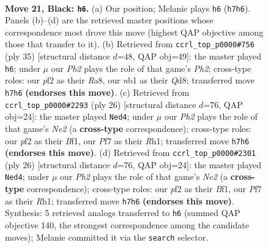 \documentclass[11pt]{article}
\begin{document}
\clearpage

\begin{figure}[p]\centering
\begin{subfigure}{0.46\textwidth}\centering
\resizebox{\linewidth}{!}{%
\newchessgame
\chessboard[
  setfen={nrbr2k1/p3qpbp/8/2p1pn1P/1p6/3PPB2/PPQ2P2/RNB1NRK1 b - - 1 21},
  showmover=false,
  pgfstyle=straightmove, color=movearrow, markmove={h7-h6}
]}
\caption{}
\end{subfigure}\hfill
\begin{subfigure}{0.46\textwidth}\centering
\resizebox{\linewidth}{!}{%
\newchessgame
\chessboard[
  setfen={r1bqrbk1/5ppp/p2p1n2/n7/Np1PP3/5N1P/1PB1QPP1/R1BR2K1 b - - 1 18},
  showmover=false,
  pgfstyle=straightmove, color=movearrow, markmove={h7-h6}
]}
\caption{}
\end{subfigure}
\\[4pt]
\begin{subfigure}{0.46\textwidth}\centering
\resizebox{\linewidth}{!}{%
\newchessgame
\chessboard[
  setfen={r3kb1r/1bq2p1p/p1nppp2/8/1p2PP2/1N6/PPPQN1PP/1K1R1B1R w kq - 2 14},
  showmover=false,
  pgfstyle=straightmove, color=movearrow, markmove={e2-d4}
]}
\caption{}
\end{subfigure}\hfill
\begin{subfigure}{0.46\textwidth}\centering
\resizebox{\linewidth}{!}{%
\newchessgame
\chessboard[
  setfen={r3kb1r/1bq2p1p/p1nppp2/8/1p2PP2/1N6/PPPQN1PP/1K1R1B1R w kq - 2 14},
  showmover=false,
  pgfstyle=straightmove, color=movearrow, markmove={e2-d4}
]}
\caption{}
\end{subfigure}
\caption{\textbf{Move 21, Black: \texttt{h6}.} (a) Our position; Melanie plays \texttt{h6} (\texttt{h7h6}). Panels (b)--(d) are the retrieved master positions whose correspondence most drove this move (highest QAP objective among those that transfer to it). (b) Retrieved from \texttt{ccrl\_top\_p0000\#756} (ply 35) [structural distance $d$=48, QAP obj=49]: the master played \texttt{h6}; under $\mu$ our \emph{Ph2} plays the role of that game's \emph{Ph2}; cross-type roles: our \emph{p}f2 as their \emph{R}a8, our \emph{n}b1 as their \emph{Q}d8; transferred move \texttt{h7h6} \textbf{(endorses this move)}. (c) Retrieved from \texttt{ccrl\_top\_p0000\#2293} (ply 26) [structural distance $d$=76, QAP obj=24]: the master played \texttt{Ned4}; under $\mu$ our \emph{Ph2} plays the role of that game's \emph{Ne2} (a \textbf{cross-type} correspondence); cross-type roles: our \emph{p}f2 as their \emph{B}f1, our \emph{P}f7 as their \emph{R}h1; transferred move \texttt{h7h6} \textbf{(endorses this move)}. (d) Retrieved from \texttt{ccrl\_top\_p0000\#2301} (ply 26) [structural distance $d$=76, QAP obj=24]: the master played \texttt{Ned4}; under $\mu$ our \emph{Ph2} plays the role of that game's \emph{Ne2} (a \textbf{cross-type} correspondence); cross-type roles: our \emph{p}f2 as their \emph{B}f1, our \emph{P}f7 as their \emph{R}h1; transferred move \texttt{h7h6} \textbf{(endorses this move)}. Synthesis: 5 retrieved analogs transferred to \texttt{h6} (summed QAP objective 140, the strongest correspondence among the candidate moves); Melanie committed it via the \texttt{search} selector.}
\label{fig:thought-m41}
\end{figure}
\end{document}
